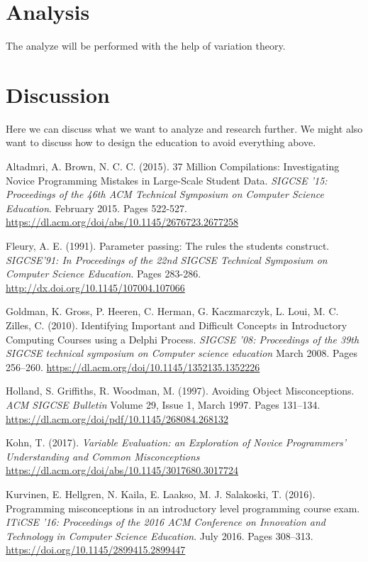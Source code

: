 \documentclass[twocolumn]{article}
\begin{document}
\section{Analysis}

The analyze will be performed with the help of variation theory. 

\section{Discussion}

Here we can discuss what we want to analyze and research further. We might also want to discuss how to design the education to avoid everything above.

\newpage

\begin{thebibliography}{9}

Altadmri, A. Brown, N. C. C. (2015). 37 Million Compilations: Investigating Novice Programming Mistakes in Large-Scale Student Data. \emph{SIGCSE '15: Proceedings of the 46th ACM Technical Symposium on Computer Science Education}. February 2015. Pages 522-527.
\url{https://dl.acm.org/doi/abs/10.1145/2676723.2677258}

Fleury, A. E. (1991). Parameter passing: The rules the students construct. \emph{SIGCSE’91:  In Proceedings of the 22nd SIGCSE Technical Symposium on Computer Science Education}. Pages 283-286.
\url{http://dx.doi.org/10.1145/107004.107066}

Goldman, K. Gross, P. Heeren, C. Herman, G. Kaczmarczyk, L. Loui, M. C. Zilles, C. (2010). Identifying Important and Difficult Concepts in Introductory Computing Courses using a Delphi Process. \emph{SIGCSE '08: Proceedings of the 39th SIGCSE technical symposium on Computer science education} March 2008. Pages 256–260.
\url{https://dl.acm.org/doi/10.1145/1352135.1352226} 

Holland, S. Griffiths, R. Woodman, M. (1997). Avoiding Object Misconceptions. \emph{ACM SIGCSE Bulletin} Volume 29, Issue 1, March 1997. Pages 131–134.
\url{https://dl.acm.org/doi/pdf/10.1145/268084.268132} 

Kohn, T.  (2017). \emph{Variable Evaluation: an Exploration of Novice Programmers’ Understanding and Common Misconceptions}
\url{https://dl.acm.org/doi/abs/10.1145/3017680.3017724}

Kurvinen, E. Hellgren, N. Kaila, E. Laakso, M. J. Salakoski, T. (2016). Programming misconceptions in an introductory level programming course exam. \emph{ITiCSE '16: Proceedings of the 2016 ACM Conference on Innovation and Technology in Computer Science Education}. July 2016. Pages 308–313. 
\url{https://doi.org/10.1145/2899415.2899447}


\end{thebibliography}
\end{document}
